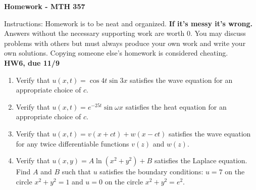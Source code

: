 \documentclass[10pt]{article}
\begin{document}
\begin{center}
{\Large\bf  Homework - MTH 357}\\
\vspace{.1in}

\end{center}

\noindent Instructions:  %
Homework is to be neat and organized.  \textbf{If it's messy it's wrong.} Answers without the necessary supporting work are worth 0.   You may discuss problems with others but must always produce your own work and write your own solutions.  Copying someone else's homework is considered cheating.\\


\noindent \textbf{HW6, due 11/9}
\begin{enumerate}
\item Verify that $u(x,t)=\cos{4t}\sin{3x}$ satisfies the wave equation for an appropriate choice of $c$.
\item Verify that $u(x,t)=e^{-25t}\sin{\omega x}$ satisfies the heat equation for an appropriate choice of $c$.
\item Verify that $u(x,t)=v(x+ct)+w(x-ct)$ satisfies the wave equation for any twice differentiable functions $v(z)$ and $w(z)$.
\item Verify that $u(x,y)=A\ln{(x^2+y^2)}+B$ satisfies the Laplace equation.  Find $A$ and $B$ such that $u$ satisfies the boundary conditions: $u=7$ on the circle $x^2+y^2=1$ and $u=0$ on the circle $x^2+y^2=e^2$.
\end{enumerate}
\end{document}
